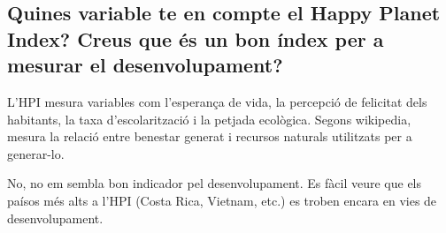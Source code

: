 \subsection{Quines variable te en compte el Happy Planet Index? 
Creus que és un bon índex per a mesurar el desenvolupament?}

L'HPI mesura variables com l'esperança de vida, la percepció de felicitat
dels habitants, la taxa d'escolarització i la petjada ecològica.
Segons wikipedia, mesura la relació entre benestar generat i recursos
naturals utilitzats per a generar-lo\cite{hpi}.

No, no em sembla bon indicador pel desenvolupament. Es fàcil veure
que els paísos més alts a l'HPI (Costa Rica, Vietnam, etc.)
es troben encara en vies de desenvolupament.
